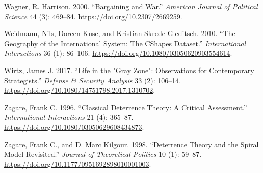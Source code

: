 \documentclass[
]{article}
\begin{document}
\leavevmode\hypertarget{ref-wagner_bargainingwar_2000}{}%
Wagner, R. Harrison. 2000. ``Bargaining and War.'' \emph{American Journal of Political Science} 44 (3): 469--84. \url{https://doi.org/10.2307/2669259}.

\leavevmode\hypertarget{ref-weidmann_geographyinternationalsystem_2010}{}%
Weidmann, Nils, Doreen Kuse, and Kristian Skrede Gleditsch. 2010. ``The Geography of the International System: The CShapes Dataset.'' \emph{International Interactions} 36 (1): 86--106. \url{https://doi.org/10.1080/03050620903554614}.

\leavevmode\hypertarget{ref-wirtz_lifegrayzone_2017}{}%
Wirtz, James J. 2017. ``Life in the "Gray Zone": Observations for Contemporary Strategists.'' \emph{Defense \& Security Analysis} 33 (2): 106--14. \url{https://doi.org/10.1080/14751798.2017.1310702}.

\leavevmode\hypertarget{ref-zagare_classicaldeterrencetheory_1996}{}%
Zagare, Frank C. 1996. ``Classical Deterrence Theory: A Critical Assessment.'' \emph{International Interactions} 21 (4): 365--87. \url{https://doi.org/10.1080/03050629608434873}.

\leavevmode\hypertarget{ref-zagare_deterrencetheoryspiral_1998}{}%
Zagare, Frank C., and D. Marc Kilgour. 1998. ``Deterrence Theory and the Spiral Model Revisited.'' \emph{Journal of Theoretical Politics} 10 (1): 59--87. \url{https://doi.org/10.1177/0951692898010001003}.
\end{document}
